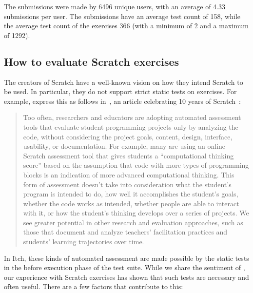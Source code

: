 \documentclass[../main]{subfiles}
\begin{document}
The submissions were made by \num{6496} unique users, with an average of \num{4.33} submissions per user.
The submissions have an average test count of \num{158}, while the average test count of the exercises \num{366} (with a minimum of \num{2} and a maximum of \num{1292}).

\subsection{How to evaluate Scratch exercises}\label{subsec:how-to-evaluate-scratch-exercises}

The creators of Scratch have a well-known vision on how they intend Scratch to be used.
In particular, they do not support strict static tests on exercises.
For example, \citeauthor{resnickCodingCrossroads2020} express this as follows in~, an article celebrating 10 years of Scratch~\autocite{resnickCodingCrossroads2020}:

\begin{quotation}
    Too often, researchers and educators are adopting automated assessment tools that evaluate student programming projects only by analyzing the code, without considering the project goals, content, design, interface, usability, or documentation.
    For example, many are using an online Scratch assessment tool that gives students a ``computational thinking score'' based on the assumption that code with more types of programming blocks is an indication of more advanced computational thinking.
    This form of assessment doesn't take into consideration what the student's program is intended to do, how well it accomplishes the student’s goals, whether the code works as intended, whether people are able to interact with it, or how the student’s thinking develops over a series of projects.
    We see greater potential in other research and evaluation approaches, such as those that document and analyze teachers’ facilitation practices and students’ learning trajectories over time.
\end{quotation}

In Itch, these kinds of automated assessment are made possible by the static tests in the before execution phase of the test suite.
While we share the sentiment of \citeauthor{resnickCodingCrossroads2020}, our experience with Scratch exercises has shown that such tests are necessary and often useful.
There are a few factors that contribute to this:
\end{document}
